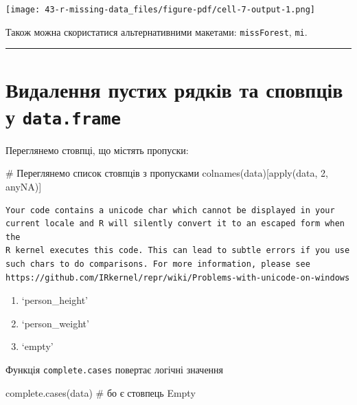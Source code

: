 \documentclass[
  letterpaper,
  DIV=11,
  numbers=noendperiod]{scrreprt}
\newenvironment{Shaded}{\begin{snugshade}}{\end{snugshade}}
\newcommand{\CommentTok}[1]{\textcolor[rgb]{0.37,0.37,0.37}{#1}}
\newcommand{\DecValTok}[1]{\textcolor[rgb]{0.68,0.00,0.00}{#1}}
\newcommand{\FunctionTok}[1]{\textcolor[rgb]{0.28,0.35,0.67}{#1}}
\newcommand{\NormalTok}[1]{\textcolor[rgb]{0.00,0.23,0.31}{#1}}
\providecommand{\tightlist}{%
  \setlength{\itemsep}{0pt}\setlength{\parskip}{0pt}}\usepackage{longtable,booktabs,array}
\begin{document}
\texttt{[image: 43-r-missing-data\_files/figure-pdf/cell-7-output-1.png]}

Також можна скористатися альтернативними макетами: \texttt{missForest},
\texttt{mi}.

\begin{center}\rule{0.5\linewidth}{0.5pt}\end{center}

\section{\texorpdfstring{Видалення пустих рядків та сповпців у
\texttt{data.frame}}{Видалення пустих рядків та сповпців у data.frame}}\label{ux432ux438ux434ux430ux43bux435ux43dux43dux44f-ux43fux443ux441ux442ux438ux445-ux440ux44fux434ux43aux456ux432-ux442ux430-ux441ux43fux43eux432ux43fux446ux456ux432-ux443-data.frame}

Переглянемо стовпці, що містять пропуски:

\begin{Shaded}
\begin{Highlighting}[]
\CommentTok{\# Переглянемо список стовпців з пропусками}
\FunctionTok{colnames}\NormalTok{(data)[}\FunctionTok{apply}\NormalTok{(data, }\DecValTok{2}\NormalTok{, anyNA)]}
\end{Highlighting}
\end{Shaded}

\begin{verbatim}
Your code contains a unicode char which cannot be displayed in your
current locale and R will silently convert it to an escaped form when the
R kernel executes this code. This can lead to subtle errors if you use
such chars to do comparisons. For more information, please see
https://github.com/IRkernel/repr/wiki/Problems-with-unicode-on-windows
\end{verbatim}

\begin{enumerate}
\def\labelenumi{\arabic{enumi}.}
\tightlist
\item
  `person\_height'
\item
  `person\_weight'
\item
  `empty'
\end{enumerate}

Функція \texttt{complete.cases} повертає логічні значення

\begin{Shaded}
\begin{Highlighting}[]
\FunctionTok{complete.cases}\NormalTok{(data) }\CommentTok{\# бо є стовпець Empty}
\end{Highlighting}
\end{Shaded}
\end{document}
